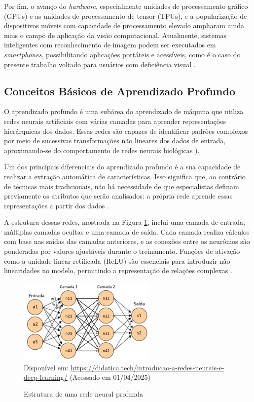 Por fim, o avanço do \textit{hardware}, especialmente unidades de processamento gráfico (GPUs) e as unidades de processamento de tensor (TPUs), e a popularização de dispositivos móveis com capacidade de processamento elevado ampliaram ainda mais o campo de aplicação da visão computacional. Atualmente, sistemas inteligentes com reconhecimento de imagem podem ser executados em \textit{smartphones}, possibilitando aplicações portáteis e acessíveis, como é o caso do presente trabalho voltado para usuários com deficiência visual \cite{geron2022}.

\subsection{\textbf{Conceitos Básicos de Aprendizado Profundo}}

O aprendizado profundo é uma subárea do aprendizado de máquina que utiliza redes neurais artificiais com várias camadas para aprender representações hierárquicas dos dados. Essas redes são capazes de identificar padrões complexos por meio de sucessivas transformações não lineares dos dados de entrada, aproximando-se do comportamento de redes neurais biológicas \cite{goodfellow2016}).

Um dos principais diferenciais do aprendizado profundo é a sua capacidade de realizar a extração automática de características. Isso significa que, ao contrário de técnicas mais tradicionais, não há necessidade de que especialistas definam previamente os atributos que serão analisados: a própria rede aprende essas representações a partir dos dados \cite{Agarwal2021-deeplearning}.

A estrutura dessas redes, mostrada na Figura \ref{fg0}, inclui uma camada de entrada, múltiplas camadas ocultas e uma camada de saída. Cada camada realiza cálculos com base nas saídas das camadas anteriores, e as conexões entre os neurônios são ponderadas por valores ajustáveis durante o treinamento. Funções de ativação como a unidade linear retificada (ReLU) são essenciais para introduzir não linearidades no modelo, permitindo a representação de relações complexas \cite{gu2018}.

\begin{figure}[htbp]
  \centering
  \caption{Estrutura de uma rede neural profunda}
  \includegraphics[width=0.6\textwidth]{Figuras/Est-rede-neural-profunda.png}
  \\
  Disponível em: \url{https://didatica.tech/introducao-a-redes-neurais-e-deep-learning/} (Acessado em 01/04/2025)
  \label{fg0}
\end{figure}

